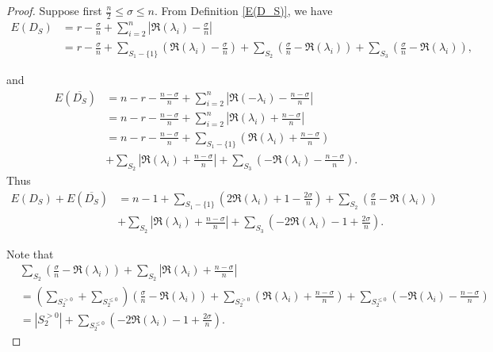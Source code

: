 \documentclass[12pt,a4paper,reqno]{amsart}
\numberwithin{equation}{section}
\theoremstyle{plain}
\theoremstyle{definition}
\newcommand{\<}{\langle}
\renewcommand{\>}{\rangle}
\begin{document}
    \begin{proof}
        Suppose first $\frac{n}{2} \leq \sigma \leq n $. From Definition \ref{E(D_S)}, we have 
        \begin{align*}
            E(D_S) &= r-\frac{\sigma}{n} + \sum_{i=2}^n \left| \Re(\lambda_i)-\frac{\sigma}{n} \right| \\
            &= r-\frac{\sigma}{n} + \sum_{S_1-\{1\}} \left( \Re(\lambda_i)-\frac{\sigma}{n} \right)+ \sum_{S_2} \left(\frac{\sigma}{n} -\Re(\lambda_i) \right)+ \sum_{S_3} \left( \frac{\sigma}{n}-\Re(\lambda_i) \right),
        \end{align*}
        
        and 
        \begin{align*}
            E(\overline{D_S}) &= n-r-\frac{n-\sigma}{n} + \sum_{i=2}^n \left| \Re(-\lambda_i)-\frac{n-\sigma}{n} \right|\\
            &= n-r-\frac{n-\sigma}{n}+\sum_{i=2}^n \left| \Re(\lambda_i)+\frac{n-\sigma}{n} \right| \\
            &= n-r-\frac{n-\sigma}{n}+ \sum_{S_1-\{1\}} \left( \Re(\lambda_i)  
            + \frac{n-\sigma}{n} \right)\\ &+ \sum_{S_2} \left| \Re(\lambda_i)+\frac{n-\sigma}{n} \right|+ \sum_{S_3} \left(-\Re(\lambda_i)-\frac{n-\sigma}{n} \right).
        \end{align*}
    Thus
    \begin{align*}
        E(D_S)+E(\overline{D_S}) 
        &= n-1+ \sum_{S_1-\{1\}}  \left( 2\Re(\lambda_i)+1-\frac{2\sigma}{n} \right) +\sum_{S_2} \left(\frac{\sigma}{n} -\Re(\lambda_i) \right) \\
        &+ \sum_{S_2} \left| \Re(\lambda_i)+\frac{n-\sigma}{n} \right| + \sum_{S_3} \left(-2\Re(\lambda_i)-1+\frac{2\sigma}{n} \right).
    \end{align*}

    Note that
    \begin{align*}
        &\sum_{S_2} \left(\frac{\sigma}{n} -\Re(\lambda_i) \right) + \sum_{S_2} \left| \Re(\lambda_i)+\frac{n-\sigma}{n} \right| \\
        &= \left( \sum_{S_2^{>0}} + \sum_{S_2^{\leq 0}} \right)  \left(\frac{\sigma}{n} -\Re(\lambda_i) \right) +  \sum_{S_2^{>0}} \left( \Re(\lambda_i)+\frac{n-\sigma}{n} \right)+\sum_{S_2^{\leq 0}} \left( -\Re(\lambda_i)-\frac{n-\sigma}{n} \right) \\
        &=|S_2^{>0}|+ \sum_{S_2^{\leq 0}} \left( -2\Re(\lambda_i)-1+\frac{2\sigma}{n} \right).
    \end{align*}


\end{proof}
\end{document}
